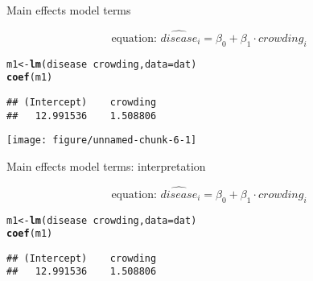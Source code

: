 \documentclass[table]{beamer}\usepackage[]{graphicx}\usepackage[]{color}
\makeatletter
\def\maxwidth{ %
  \ifdim\Gin@nat@width>\linewidth
    \linewidth
  \else
    \Gin@nat@width
  \fi
}
\newcommand{\hlopt}[1]{\textcolor[rgb]{0,0,0}{#1}}%
\newcommand{\hlstd}[1]{\textcolor[rgb]{0.345,0.345,0.345}{#1}}%
\newcommand{\hlkwb}[1]{\textcolor[rgb]{0.69,0.353,0.396}{#1}}%
\newcommand{\hlkwc}[1]{\textcolor[rgb]{0.333,0.667,0.333}{#1}}%
\newcommand{\hlkwd}[1]{\textcolor[rgb]{0.737,0.353,0.396}{\textbf{#1}}}%
\newenvironment{kframe}{%
 \def\at@end@of@kframe{}%
 \ifinner\ifhmode%
  \def\at@end@of@kframe{\end{minipage}}%
  \begin{minipage}{\columnwidth}%
 \fi\fi%
 \def\FrameCommand##1{\hskip\@totalleftmargin \hskip-\fboxsep
 \colorbox{shadecolor}{##1}\hskip-\fboxsep
     \hskip-\linewidth \hskip-\@totalleftmargin \hskip\columnwidth}%
 \MakeFramed {\advance\hsize-\width
   \@totalleftmargin\z@ \linewidth\hsize
   \@setminipage}}%
 {\par\unskip\endMakeFramed%
 \at@end@of@kframe}
\newenvironment{knitrout}{}{} %
\makeatother
\begin{document}


\begin{frame}[fragile]{Main effects model terms}

$$ \mbox{equation: \ }  \widehat{disease}_i = \beta_0 + \beta_1\cdot crowding_i $$

\begin{knitrout}\scriptsize
{}\color{fgcolor}\begin{kframe}
\begin{alltt}
\hlstd{m1} \hlkwb{<-} \hlkwd{lm}\hlstd{(disease} \hlopt{~} \hlstd{crowding,} \hlkwc{data}\hlstd{=dat)}
\hlkwd{coef}\hlstd{(m1)}
\end{alltt}
\begin{verbatim}
## (Intercept)    crowding 
##   12.991536    1.508806
\end{verbatim}
\end{kframe}
\end{knitrout}

\begin{knitrout}\scriptsize
{}\color{fgcolor}
\texttt{[image: figure/unnamed-chunk-6-1]} 
\end{knitrout}


\end{frame}




\begin{frame}[fragile]{Main effects model terms: interpretation}

$$ \mbox{equation: \ }  \widehat{disease}_i = \beta_0 + \beta_1\cdot crowding_i $$

\begin{knitrout}\scriptsize
{}\color{fgcolor}\begin{kframe}
\begin{alltt}
\hlstd{m1} \hlkwb{<-} \hlkwd{lm}\hlstd{(disease} \hlopt{~} \hlstd{crowding,} \hlkwc{data}\hlstd{=dat)}
\hlkwd{coef}\hlstd{(m1)}
\end{alltt}
\begin{verbatim}
## (Intercept)    crowding 
##   12.991536    1.508806
\end{verbatim}
\end{kframe}
\end{knitrout}



\end{frame}
\end{document}
